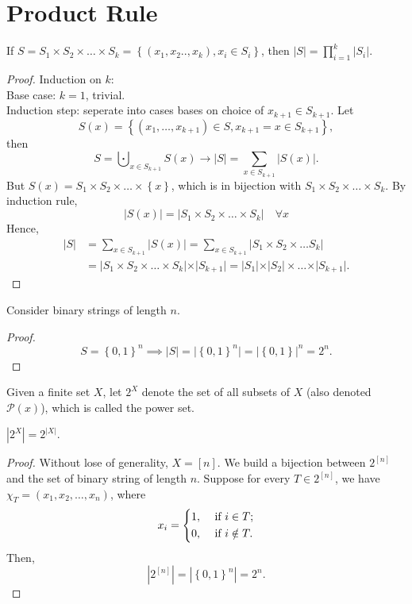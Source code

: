 \section{Product Rule}
\begin{theorem}
  If \(S = S_1 \times S_2 \times \dots \times S_k = \left\{ \left( x_1,x_2 ..,x_k \right), x_i \in S_i  \right\} \), then \(\vert S \vert = \prod_{i=1}^{k}\vert S_i \vert. \) 
\end{theorem} 
\begin{proof}
  Induction on \(k\): \\
  Base case: \(k=1\), trivial. \\
  Induction step: seperate into cases bases on choice of \(x_{k+1} \in S_{k+1}\). Let
  \[
    S(x) = \left\{ \left( x_1, \dots , x_{k+1} \right) \in S, x_{k+1}=x\in S_{k+1}  \right\},
  \] then 
  \[
    S = \bigcupdot_{x \in S_{k+1}}S(x) \to \vert S \vert = \sum_{x \in S_{k+1}} \left\vert S(x) \right\vert.   
  \]
  But \(S(x) = S_1 \times S_2 \times \dots \times \left\{ x \right\} \), which is in bijection with \(S_1 \times S_2 \times \dots \times S_k\). By induction rule, 
  \[
    \vert S(x) \vert = \vert S_1 \times S_2 \times \dots \times S_k \vert  \quad \forall x
  \]  
  Hence, 
  \begin{align*}
    \vert S \vert &= \sum_{x \in S_{k+1}} \vert S(x) \vert = \sum_{x \in S_{k+1}} \left\vert S_1 \times S_2 \times \dots S_k \right\vert \\ 
    &= \left\vert S_1 \times S_2 \times \dots \times S_k \right\vert \times \vert S_{k+1} \vert = \vert S_1 \vert  \times \vert S_2 \vert \times \dots \times \vert S_{k+1} \vert.  
  \end{align*}
\end{proof}
\begin{eg}
  Consider binary strings of length \(n\). 
\end{eg}
\begin{proof}
  \[
    S = \left\{ 0,1 \right\}^n \implies \vert S \vert = \vert \left\{ 0,1 \right\}^n  \vert = \vert \left\{ 0,1 \right\}  \vert^n = 2^n.   
  \] 
\end{proof}

\begin{definition}
  Given a finite set \(X\), let \(2^X\) denote the set of all subsets of \(X\) (also denoted \(\mathcal{P} (x)\)), which is called the power set. 
\end{definition}
\begin{corollary}
  \(\left\vert 2^X \right\vert = 2^{\vert X \vert } \). 
\end{corollary}
\begin{proof}
  Without lose of generality, \(X = [n]\). We build a bijection between \(2^{[n]}\) and the set of binary string of length \(n\). Suppose for every \(T \in 2^{[n]}\), we have \(\chi _T = \left( x_1, x_2, \dots ,x_n \right) \), where 
  \[
    x_i = \begin{dcases}
      1, &\text{ if }  i \in T;\\
      0, &\text{ if }  i \notin T.
    \end{dcases}
  \]
  Then,
  \[
    \left\vert 2^{[n]} \right\vert = \left\vert \left\{ 0,1 \right\}^n  \right\vert = 2^n .  
  \]    
\end{proof}
